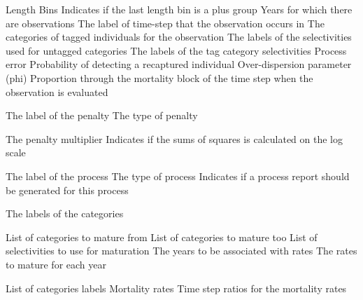 \par\textbf{}\par
{} {Length Bins}
 {Indicates if the last length bin is a plus group}
 {Years for which there are observations}
 {The label of time-step that the observation occurs in}
 {The categories of tagged individuals for the observation}
 {The labels of the selectivities used for untagged categories}
 {The labels of the tag category selectivities}
 {Process error}
 {Probability of detecting a recaptured individual}
 {Over-dispersion parameter (phi)}
 {Proportion through the mortality block of the time step when the observation is evaluated}
\par\par
{} {The label of the penalty}
 {The type of penalty}
\par\textbf{}\par
{} {The penalty multiplier}
 {Indicates if the sums of squares is calculated on the log scale}
\par\par
{} {The label of the process}
 {The type of process}
 {Indicates if a process report should be generated for this process}
\par\textbf{}\par
{} {The labels of the categories}
\par\textbf{}\par
{} {List of categories to mature from}
 {List of categories to mature too}
 {List of selectivities to use for maturation}
 {The years to be associated with rates}
 {The rates to mature for each year}
\par\textbf{}\par
{} {List of categories labels}
 {Mortality rates}
 {Time step ratios for the mortality rates}
